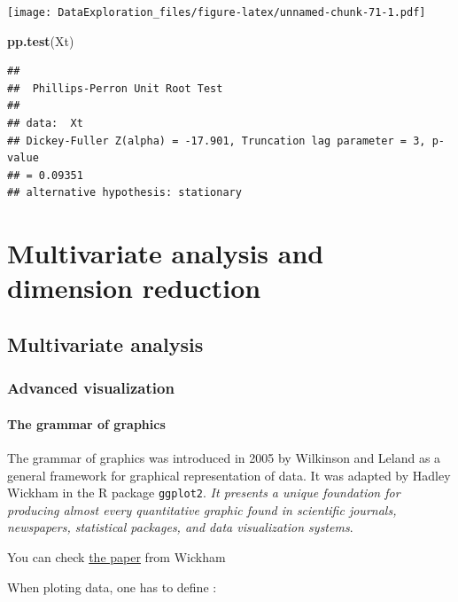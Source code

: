 \documentclass[
]{book}
\newenvironment{Shaded}{\begin{snugshade}}{\end{snugshade}}
\newcommand{\KeywordTok}[1]{\textcolor[rgb]{0.13,0.29,0.53}{\textbf{#1}}}
\newcommand{\NormalTok}[1]{#1}
\begin{document}
\texttt{[image: DataExploration\_files/figure-latex/unnamed-chunk-71-1.pdf]}

\begin{Shaded}
\begin{Highlighting}[]
\KeywordTok{pp.test}\NormalTok{(Xt)}
\end{Highlighting}
\end{Shaded}

\begin{verbatim}
## 
## 	Phillips-Perron Unit Root Test
## 
## data:  Xt
## Dickey-Fuller Z(alpha) = -17.901, Truncation lag parameter = 3, p-value
## = 0.09351
## alternative hypothesis: stationary
\end{verbatim}

\hypertarget{multivariate-analysis-and-dimension-reduction}{%
\chapter{Multivariate analysis and dimension reduction}\label{multivariate-analysis-and-dimension-reduction}}

\hypertarget{multivar}{%
\section{Multivariate analysis}\label{multivar}}

\hypertarget{adv_viz}{%
\subsection{Advanced visualization}\label{adv_viz}}

\hypertarget{the-grammar-of-graphics}{%
\subsubsection{The grammar of graphics}\label{the-grammar-of-graphics}}

The grammar of graphics was introduced in 2005 by Wilkinson and Leland as a general framework for graphical representation of data. It was adapted by Hadley Wickham in the R package \texttt{ggplot2}.
\emph{It presents a unique foundation for producing almost every quantitative graphic found in scientific journals, newspapers, statistical packages, and data visualization systems}.

You can check \href{https://vita.had.co.nz/papers/layered-grammar.html}{the paper} from Wickham

When ploting data, one has to define :
\end{document}
